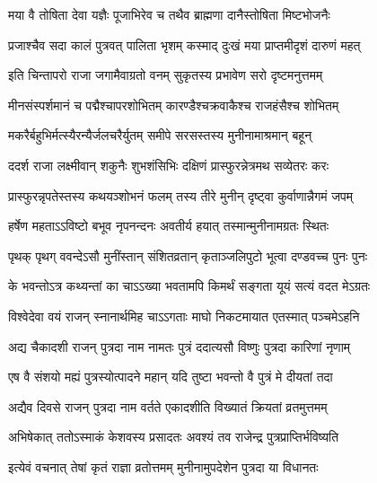 \twolineshloka
{मया वै तोषिता देवा यज्ञैः पूजाभिरेव च}
{तथैव ब्राह्मणा दानैस्तोषिता मिष्टभोजनैः}%

\twolineshloka
{प्रजाश्चैव सदा कालं पुत्रवत् पालिता भृशम्}
{कस्माद् दुःखं मया प्राप्तमीदृशं दारुणं महत्}%

\twolineshloka
{इति चिन्तापरो राजा जगामैवाग्रतो वनम्}
{सुकृतस्य प्रभावेण सरो दृष्टमनुत्तमम्}%

\twolineshloka
{मीनसंस्पर्शमानं च पद्मैश्चापरशोभितम्}
{कारण्डैश्चक्रवाकैश्च राजहंसैश्च शोभितम्}%

\twolineshloka
{मकरैर्बहुभिर्मत्स्यैरन्यैर्जलचरैर्युतम्}
{समीपे सरसस्तस्य मुनीनामाश्रमान् बहून्}%

\twolineshloka
{ददर्श राजा लक्ष्मीवान् शकुनैः शुभशंसिभिः}
{दक्षिणं प्रास्फुरन्नेत्रमथ सव्येतरः करः}%

\twolineshloka
{प्रास्फुरन्नृपतेस्तस्य कथयञ्शोभनं फलम्}
{तस्य तीरे मुनीन् दृष्ट्वा कुर्वाणान्नैगमं जपम्}%

\twolineshloka
{हर्षेण महताऽऽविष्टो बभूव नृपनन्दनः}
{अवतीर्य हयात् तस्मान्मुनीनामग्रतः स्थितः}%

\twolineshloka
{पृथक् पृथग् ववन्देऽसौ मुनींस्तान् संशितव्रतान्}
{कृताञ्जलिपुटो भूत्वा दण्डवच्च पुनः पुनः}%



\twolineshloka
{के भवन्तोऽत्र कथ्यन्तां का चाऽऽख्या भवतामपि}
{किमर्थं सङ्गता यूयं सत्यं वदत मेऽग्रतः}%


\twolineshloka
{विश्वेदेवा वयं राजन् स्नानार्थमिह चाऽऽगताः}
{माघो निकटमायात एतस्मात् पञ्चमेऽहनि}%

\twolineshloka
{अद्य चैकादशी राजन् पुत्रदा नाम नामतः}
{पुत्रं ददात्यसौ विष्णुः पुत्रदा कारिणां नृणाम्}%


\twolineshloka
{एष वै संशयो मह्यं पुत्रस्योत्पादने महान्}
{यदि तुष्टा भवन्तो वै पुत्रं मे दीयतां तदा}%


\twolineshloka
{अद्यैव दिवसे राजन् पुत्रदा नाम वर्तते}
{एकादशीति विख्यातं क्रियतां व्रतमुत्तमम्}%

\twolineshloka
{अभिषेकात् ततोऽस्माकं केशवस्य प्रसादतः}
{अवश्यं तव राजेन्द्र पुत्रप्राप्तिर्भविष्यति}%

\twolineshloka
{इत्येवं वचनात् तेषां कृतं राज्ञा व्रतोत्तमम्}
{मुनीनामुपदेशेन पुत्रदा या विधानतः}%

